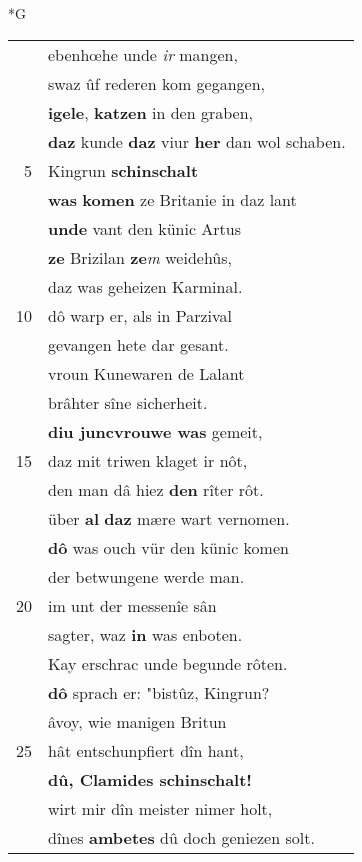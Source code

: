 \documentclass[8pt,a4paper,notitlepage]{article}
\begin{document}
\newpage
\begin{table}[ht]
\begin{minipage}[t]{0.5\linewidth}
\small
\begin{center}*G
\end{center}
\begin{tabular}{rl}
 & ebenhœhe unde \textit{ir} mangen,\\ 
 & swaz ûf rederen kom gegangen,\\ 
 & \textbf{igele}, \textbf{katzen} in den graben,\\ 
 & \textbf{daz} kunde \textbf{daz} viur \textbf{her} dan wol schaben.\\ 
5 & Kingrun \textbf{schinschalt}\\ 
 & \textbf{was} \textbf{komen} ze Britanie in daz lant\\ 
 & \textbf{unde} vant den künic Artus\\ 
 & \textbf{ze} Brizilan \textbf{ze}\textit{m} weidehûs,\\ 
 & daz was geheizen Karminal.\\ 
10 & dô warp er, als in Parzival\\ 
 & gevangen hete dar gesant.\\ 
 & vroun Kunewaren de Lalant\\ 
 & brâhter sîne sicherheit.\\ 
 & \textbf{diu juncvrouwe was} gemeit,\\ 
15 & daz mit triwen klaget ir nôt,\\ 
 & den man dâ hiez \textbf{den} rîter rôt.\\ 
 & über \textbf{al} \textbf{daz} mære wart vernomen.\\ 
 & \textbf{dô} was ouch vür den künic komen\\ 
 & der betwungene werde man.\\ 
20 & im unt der messenîe sân\\ 
 & sagter, waz \textbf{in} was enboten.\\ 
 & Kay erschrac unde begunde rôten.\\ 
 & \textbf{dô} sprach er: "bistûz, Kingrun?\\ 
 & âvoy, wie manigen Britun\\ 
25 & hât entschunpfiert dîn hant,\\ 
 & \textbf{dû, Clamides schinschalt!}\\ 
 & wirt mir dîn meister nimer holt,\\ 
 & dînes \textbf{ambetes} dû doch geniezen solt.\\ 

\end{tabular}
\end{minipage}
\end{table}
\end{document}
